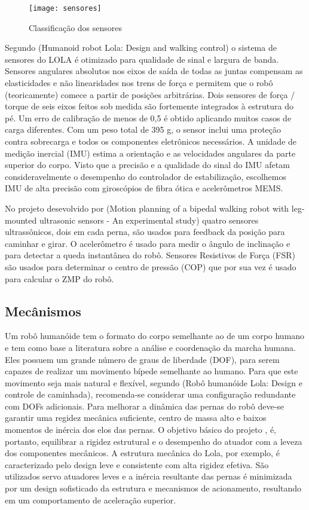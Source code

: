 \begin{figure} [H]
    \centering
    \caption{Classificação dos sensores}
    \texttt{[image: sensores]}
    \label{fig:sensors}
\end{figure}

Segundo (Humanoid robot Lola: Design and walking control) o sistema de sensores do LOLA é otimizado para qualidade de sinal e largura de banda. Sensores angulares absolutos nos eixos de saída de todas as juntas compensam as elasticidades e não linearidades nos trens de força e permitem que o robô (teoricamente) comece a partir de posições arbitrárias. Dois sensores de força / torque de seis eixos feitos sob medida são fortemente integrados à estrutura do pé. Um erro de calibração de menos de 0,5 é obtido aplicando muitos casos de carga diferentes. Com um peso total de 395 g, o sensor inclui uma proteção contra sobrecarga e todos os componentes eletrônicos necessários. A unidade de medição inercial (IMU) estima a orientação e as velocidades angulares da parte superior do corpo. Visto que a precisão e a qualidade do sinal do IMU afetam consideravelmente o desempenho do controlador de estabilização, escolhemos IMU de alta precisão com giroscópios de fibra ótica e acelerômetros MEMS.

No projeto desevolvido por (Motion  planning  of  a  bipedal  walking  robot  with  leg-mounted ultrasonic  sensors  -  An  experimental  study) quatro sensores ultrassônicos, dois em cada perna, são usados para feedback da posição para caminhar e girar. O acelerômetro é usado para medir o ângulo de inclinação e para detectar a queda instantânea do robô. Sensores Resistivos de Força (FSR) são usados para determinar o centro de pressão (COP) que por sua vez é usado para calcular o ZMP do robô.


\subsection{Mecânismos}
\label{ssec:mec}

Um robô humanóide tem o formato do corpo semelhante ao de um corpo humano e tem como base a literatura sobre a análise e coordenação da marcha humana. Eles possuem um grande número de graus de liberdade (DOF), para serem capazes de realizar um movimento bípede semelhante ao humano. Para que este movimento seja mais natural e flexível, segundo (Robô humanóide Lola: Design e controle de caminhada), recomenda-se considerar uma configuração redundante com DOFs adicionais.
Para melhorar a dinâmica das pernas do robô deve-se garantir uma regidez mecânica suficiente, centro de massa alto e baixos momentos de inércia dos elos das pernas.
O objetivo básico do projeto , é, portanto, equilibrar a rigidez estrutural e o desempenho do atuador com a leveza dos componentes mecânicos.
A estrutura mecânica do Lola, por exemplo, é caracterizado pelo design leve e consistente com alta rigidez efetiva.
São utilizados servo atuadores leves e a inércia resultante das pernas é minimizada por um design sofisticado da estrutura e mecanismos de acionamento, resultando em um comportamento de aceleração superior.

